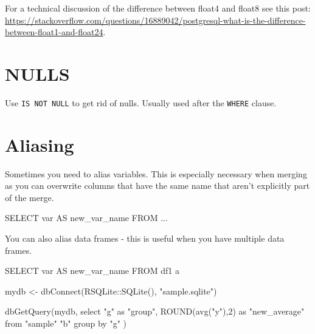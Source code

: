 \documentclass[
  letterpaper,
  DIV=11,
  numbers=noendperiod]{scrreprt}
\newenvironment{Shaded}{\begin{snugshade}}{\end{snugshade}}
\newcommand{\FunctionTok}[1]{\textcolor[rgb]{0.28,0.35,0.67}{#1}}
\newcommand{\KeywordTok}[1]{\textcolor[rgb]{0.00,0.23,0.31}{#1}}
\newcommand{\NormalTok}[1]{\textcolor[rgb]{0.00,0.23,0.31}{#1}}
\newcommand{\OperatorTok}[1]{\textcolor[rgb]{0.37,0.37,0.37}{#1}}
\newcommand{\OtherTok}[1]{\textcolor[rgb]{0.00,0.23,0.31}{#1}}
\newcommand{\SpecialCharTok}[1]{\textcolor[rgb]{0.37,0.37,0.37}{#1}}
\newcommand{\StringTok}[1]{\textcolor[rgb]{0.13,0.47,0.30}{#1}}
\begin{document}
For a technical discussion of the difference between float4 and float8
see this post:
\url{https://stackoverflow.com/questions/16889042/postgresql-what-is-the-difference-between-float1-and-float24}.

\hypertarget{nulls}{%
\section{NULLS}\label{nulls}}

Use \texttt{IS\ NOT\ NULL} to get rid of nulls. Usually used after the
\texttt{WHERE} clause.

\hypertarget{aliasing}{%
\section{Aliasing}\label{aliasing}}

Sometimes you need to alias variables. This is especially necessary when
merging as you can overwrite columns that have the same name that aren't
explicitly part of the merge.

\begin{Shaded}
\begin{Highlighting}[]
\KeywordTok{SELECT}\NormalTok{ var }\KeywordTok{AS}\NormalTok{ new\_var\_name}
\KeywordTok{FROM} \OperatorTok{..}\NormalTok{.}
\end{Highlighting}
\end{Shaded}

You can also alias data frames - this is useful when you have multiple
data frames.

\begin{Shaded}
\begin{Highlighting}[]
\KeywordTok{SELECT}\NormalTok{ var }\KeywordTok{AS}\NormalTok{ new\_var\_name}
\KeywordTok{FROM}\NormalTok{ df1 a }
\end{Highlighting}
\end{Shaded}

\begin{Shaded}
\begin{Highlighting}[]
\NormalTok{mydb }\OtherTok{\textless{}{-}} \FunctionTok{dbConnect}\NormalTok{(RSQLite}\SpecialCharTok{::}\FunctionTok{SQLite}\NormalTok{(), }\StringTok{"sample.sqlite"}\NormalTok{)}

\FunctionTok{dbGetQuery}\NormalTok{(mydb,}\StringTok{\textquotesingle{}}
\StringTok{  select "g" as "group", ROUND(avg("y"),2) as "new\_average"}
\StringTok{  from "sample" "b"}
\StringTok{  group by "g"}
\StringTok{\textquotesingle{}}\NormalTok{)}
\end{Highlighting}
\end{Shaded}
\end{document}
